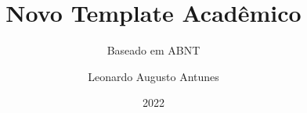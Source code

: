 \documentclass{AcademicNew}
\author{Leonardo Augusto Antunes}
\title{Novo Template Acadêmico}
\subtitle{Baseado em ABNT}
\date{2022}
\begin{document}
    \cover
    \titlePage
    \contents
    
    
    \biblio
\end{document}

